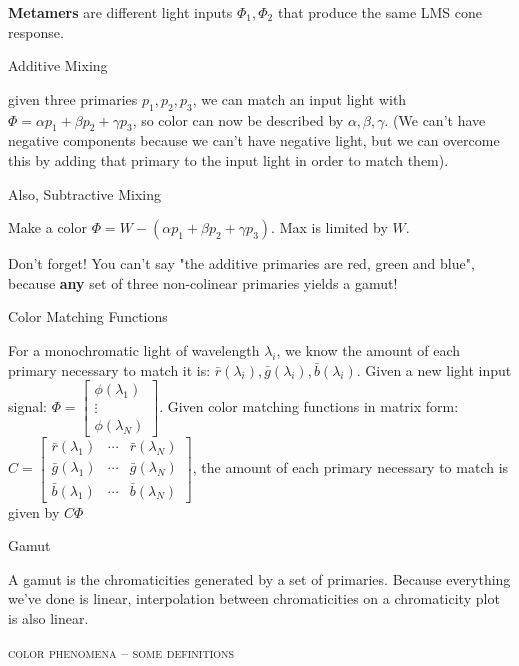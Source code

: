 \documentclass{article}
\begin{document}
{\bf Metamers} are different light inputs $\Phi_1,\Phi_2$ that produce the same LMS cone response.

\vspace{10pt}
Additive Mixing

given three primaries $p_1,p_2,p_3$, we can match an input light with $\Phi=\alpha p_1+\beta p_2 + \gamma p_3$, so color can now be described by $\alpha,\beta,\gamma$. (We can't have negative components because we can't have negative light, but we can overcome this by adding that primary to the input light in order to match them).
\vspace{10pt}

Also, Subtractive Mixing

Make a color $\Phi=W-(\alpha p_1+\beta p_2 + \gamma p_3)$. Max is limited by $W$.

Don't forget! You can't say "the additive primaries are red, green and blue", because {\bf any} set of three non-colinear primaries yields a gamut!

\vspace{10pt}

Color Matching Functions

For a monochromatic light of wavelength $\lambda_i$, we know the amount of each primary necessary to match it is: $\bar{r}(\lambda_i),\bar{g}(\lambda_i),\bar{b}(\lambda_i)$. Given a new light input signal: $\Phi = \begin{bmatrix} \phi(\lambda_1) \\ \vdots \\ \phi(\lambda_N) \end{bmatrix} $. Given color matching functions in matrix form: $C = \begin{bmatrix} \bar{r}(\lambda_1) & \cdots & \bar{r}(\lambda_N) \\ \bar{g}(\lambda_1) & \cdots & \bar{g}(\lambda_N) \\ \bar{b}(\lambda_1) & \cdots & \bar{b}(\lambda_N) \end{bmatrix} $, the amount of each primary necessary to match is given by $C\Phi$

\vspace{10pt}
Gamut

A gamut is the chromaticities generated by a set of primaries. Because everything we've done is linear, interpolation between chromaticities on a chromaticity plot is also linear. 

\begin{center}\textsc{color phenomena -- some definitions}\end{center} 
	
\end{document}
